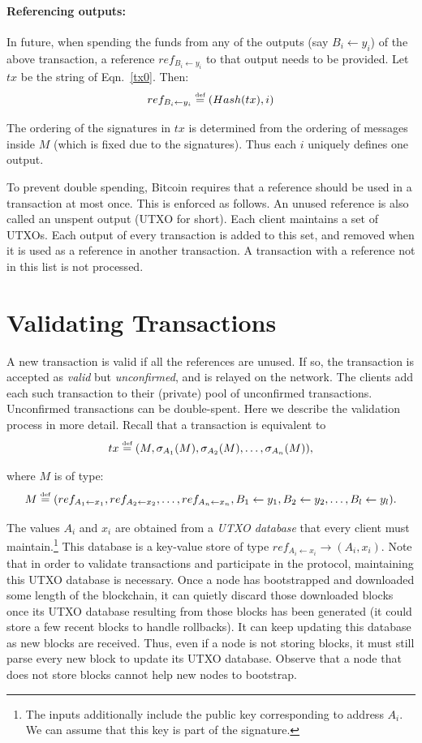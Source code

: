 \documentclass[]{report}   %
\newcommand{\ra}{\rightarrow}
\newcommand{\la}{\leftarrow}
\newcommand{\defined}{\stackrel{\mbox{\tiny{def}}}{=}}
\begin{document}
\paragraph{Referencing outputs:} In future, when spending the funds from any of the outputs (say $B_i \la y_i$) of the above transaction, a reference $ref_{B_i \leftarrow y_i}$ to that output needs to be provided. %
Let $tx$ be the string of Eqn.~\ref{tx0}. Then: \[ref_{B_i \leftarrow y_i}\defined (Hash(tx), i)\]

The ordering of the signatures in $tx$ is determined from the ordering of messages inside $M$ (which is fixed due to the signatures). Thus each $i$ uniquely defines one output.

To prevent double spending, Bitcoin requires that a reference should be used in a transaction at most once. This is enforced as follows.
An unused reference is also called an unspent output (UTXO for short). Each client maintains a set of UTXOs.
Each output of every transaction is added to this set, and removed when it is used as a reference in another transaction.
A transaction with a reference not in this list is not processed.

\section{Validating Transactions}


A new transaction is valid if all the references are unused. If so, the transaction is accepted as {\em valid} but {\em unconfirmed}, and is relayed on the network. The clients add each such transaction to their (private) pool of unconfirmed transactions. Unconfirmed transactions can be double-spent. Here we describe the validation process in more detail.
Recall that a transaction is equivalent to 
$$tx\defined (M, \sigma_{A_1}(M), \sigma_{A_2}(M), \ldots, \sigma_{A_n}(M)),$$ 

where $M$ is of type:
\[
M \defined (ref_{A_1\leftarrow x_1}, ref_{A_2\leftarrow x_2}, \ldots, ref_{A_n\leftarrow x_n}, B_1\la y_1,
B_2\la y_2, \ldots, B_l\la y_l).
\] 

The values $A_i$ and $x_i$ are obtained from a {\em UTXO database} that every client must maintain.\footnote{The inputs additionally include the public key corresponding to address $A_i$. We can assume that this key is part of the signature.} 
This database is a key-value store of type $ref_{A_i \leftarrow x_i} \ra (A_i, x_i)$. Note that in order to validate transactions and participate in the protocol, maintaining this UTXO database is necessary. Once a node has bootstrapped and downloaded some length of the blockchain, it can quietly discard those downloaded blocks once its UTXO database resulting from those blocks has been generated (it could store a few recent blocks to handle rollbacks). It can keep updating this database as new blocks are received. Thus, even if a node is not storing blocks, it must still parse every new block to update its UTXO database. Observe that a node that does not store blocks cannot help new nodes to bootstrap.
\end{document}

